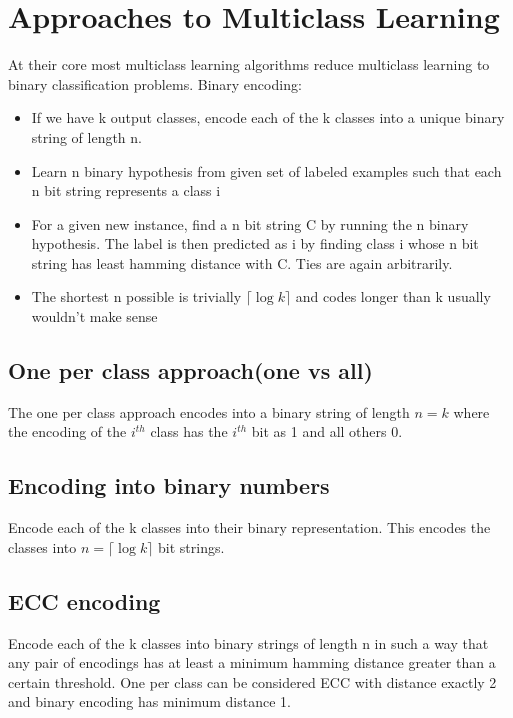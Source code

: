 \documentclass[11pt]{article}
\begin{document}
\section{Approaches to Multiclass Learning}
	At their core most multiclass learning algorithms reduce multiclass learning to binary classification problems. 
	Binary encoding:
	\begin{itemize}
		\item If we have k output classes, encode each of the k classes into a unique binary string of length n.
		\item Learn n binary hypothesis from given set of labeled examples such that each n bit string represents a class i
		\item For a given new instance, find a n bit string C by running the n binary hypothesis. The label is then predicted as i by finding class i whose n bit string has least hamming distance with C. Ties are again arbitrarily.
		\item The shortest n possible is trivially $\lceil \log k \rceil$ and codes longer than k usually wouldn't make sense
	\end{itemize}
    \subsection{One per class approach(one vs all)}
        The one per class approach encodes into a binary string of length $n=k$ where the encoding of the $i^{th}$ class has the $i^{th}$ bit as 1 and all others 0.
    \subsection{Encoding into binary numbers}
        Encode each of the k classes into their binary representation. This encodes the classes into $n = \lceil \log k \rceil$ bit strings.
    \subsection{ECC encoding}
        Encode each of the k classes into binary strings of length n in such a way that any pair of encodings has at least a minimum hamming distance greater than a certain threshold. One per class can be considered ECC with distance exactly 2 and binary encoding has minimum distance 1.
\end{document}
